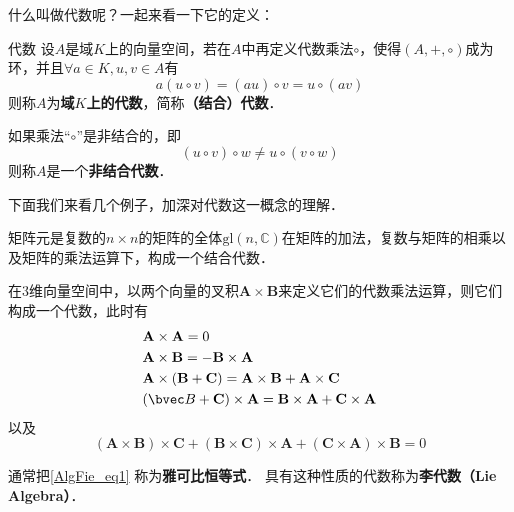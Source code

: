 

什么叫做代数呢？一起来看一下它的定义：
\begin{definition}{代数}
设$A$是域$K$上的向量空间，若在$A$中再定义代数乘法$\circ$，使得$(A,+,\circ)$成为环，并且$\forall a\in K, u, v\in A$有
\begin{equation}
a(u \circ v)=(a u) \circ v=u{\circ}(a v)
\end{equation}
则称$A$为\textbf{域$K$上的代数}，简称\textbf{（结合）代数}．

如果乘法“$\circ$”是非结合的，即
\begin{equation}
\left(u {\circ} v\right) \circ w \neq u{\circ}\left(v{\circ} w\right)
\end{equation}
则称$A$是一个\textbf{非结合代数}．
\end{definition}

下面我们来看几个例子，加深对代数这一概念的理解．

\begin{example}{}
矩阵元是复数的$n\times n$的矩阵的全体$\mathrm{gl}(n, \mathbb C)$在矩阵的加法，复数与矩阵的相乘以及矩阵的乘法运算下，构成一个结合代数．
\end{example}

\begin{example}{}
在$3$维向量空间中，以两个向量的叉积$\mathbf A\times \mathbf B$来定义它们的代数乘法运算，则它们构成一个代数，此时有
\begin{equation}
\begin{aligned}
&\mathbf{A} \times \mathbf{A}=0\\
&\mathbf{A} \times \mathbf{B}=-\mathbf{B} \times \mathbf{A}\\
&\mathbf{A} \times(\mathbf{B}+\mathbf{C})=\mathbf{A} \times \mathbf{B}+\mathbf{A} \times \mathbf{C}\\
&(\bvec B+\mathbf{C}) \times \mathbf{A}=\mathbf{B} \times \mathbf{A}+\mathbf{C} \times \mathbf{A}
\end{aligned}
\end{equation}
以及
\begin{equation} \label{AlgFie_eq1}
(\mathbf{A} \times \mathbf{B}) \times \mathbf{C}+(\mathbf{B} \times \mathbf{C}) \times \mathbf{A}+(\mathbf{C} \times \mathbf{A}) \times \mathbf{B}=0
\end{equation}
\end{example}

通常把\autoref{AlgFie_eq1} 称为\textbf{雅可比恒等式}． 具有这种性质的代数称为\textbf{李代数（Lie Algebra）}．

